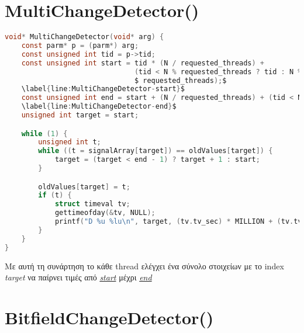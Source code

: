 \section{MultiChangeDetector()}

\begin{lstlisting}[language=c, caption={MultiChangeDetector()}, escapechar=$]
void* MultiChangeDetector(void* arg) {
    const parm* p = (parm*) arg;
    const unsigned int tid = p->tid;
    const unsigned int start = tid * (N / requested_threads) +
                               (tid < N % requested_threads ? tid : N %$ 
                               $ requested_threads);$    
    \label{line:MultiChangeDetector-start}$
    const unsigned int end = start + (N / requested_threads) + (tid < N % requested_threads);$
    \label{line:MultiChangeDetector-end}$
    unsigned int target = start;

    while (1) {
        unsigned int t;
        while ((t = signalArray[target]) == oldValues[target]) {
            target = (target < end - 1) ? target + 1 : start;
        }

        oldValues[target] = t;
        if (t) {
            struct timeval tv;
            gettimeofday(&tv, NULL);
            printf("D %u %lu\n", target, (tv.tv_sec) * MILLION + (tv.tv_usec));
        }
    }
}
\end{lstlisting}

Με αυτή τη συνάρτηση το κάθε thread ελέγχει ένα σύνολο στοιχείων με το index 
\textit{target} να παίρνει τιμές από 
\hyperref[line:MultiChangeDetector-start]{\textit{start}} μέχρι 
\hyperref[line:MultiChangeDetector-end]{\textit{end}}

\section{BitfieldChangeDetector()}

